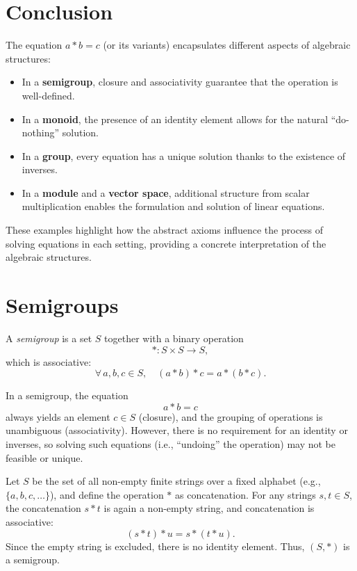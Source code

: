 \documentclass[11pt,openany]{article}
\begin{document}
\section{Conclusion}
The equation \(a\ast b = c\) (or its variants) encapsulates different aspects of algebraic structures:
\begin{itemize}
	\item In a \textbf{semigroup}, closure and associativity guarantee that the operation is well-defined.
	\item In a \textbf{monoid}, the presence of an identity element allows for the natural “do-nothing” solution.
	\item In a \textbf{group}, every equation has a unique solution thanks to the existence of inverses.
	\item In a \textbf{module} and a \textbf{vector space}, additional structure from scalar multiplication enables the formulation and solution of linear equations.
\end{itemize}
These examples highlight how the abstract axioms influence the process of solving equations in each setting, providing a concrete interpretation of the algebraic structures.

\newpage

\section{Semigroups}
\begin{definition}[Semigroup]
	A \emph{semigroup} is a set \(S\) together with a binary operation 
	\[
	\ast: S\times S \to S,
	\]
	which is associative:
	\[
	\forall\, a,b,c\in S,\quad (a\ast b)\ast c = a\ast (b\ast c).
	\]
\end{definition}

In a semigroup, the equation
\[
a\ast b = c
\]
always yields an element \(c\in S\) (closure), and the grouping of operations is unambiguous (associativity). However, there is no requirement for an identity or inverses, so solving such equations (i.e., “undoing” the operation) may not be feasible or unique.

\begin{example}
	Let \(S\) be the set of all non-empty finite strings over a fixed alphabet (e.g., \(\{a,b,c,\dots\}\)), and define the operation \(\ast\) as concatenation. For any strings \(s,t\in S\), the concatenation \(s\ast t\) is again a non-empty string, and concatenation is associative:
	\[
	(s\ast t)\ast u = s\ast (t\ast u).
	\]
	Since the empty string is excluded, there is no identity element. Thus, \((S,\ast)\) is a semigroup.
\end{example}
\end{document}
